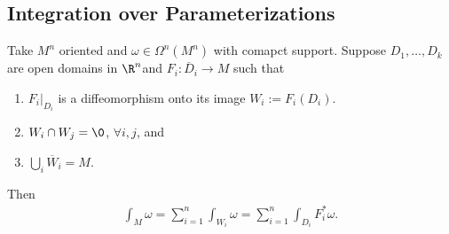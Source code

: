 \documentclass[11pt]{article}
\begin{document}
\subsection*{Integration over Parameterizations}
\label{sec:org1ce78e8}
Take \(M^{n}\) oriented and \(\omega\in\Omega^{n}(M^{n})\) with comapct support. Suppose \(D_{1},\ldots,D_{k}\) are open domains in \(\R^{n}\)and \(F_{i}:\overline{D}_{i}\to M\) such that\\
\begin{enumerate}
\item \(F_{i}|_{D_{i}}\) is a diffeomorphism onto its image \(W_{i}:=F_{i}(D_{i})\).\\
\item \(W_{i}\cap W_{j}=\0\), \(\forall i,j\), and\\
\item \(\bigcup_{i}\overline{W}_{i}=M\).\\
\end{enumerate}

Then\\
\begin{align*}
  \int_{M}\omega
  =\sum_{i=1}^{n}\int_{W_{i}}\omega
  =\sum_{i=1}^{n}\int_{D_{i}}F_{i}^{*}\omega.
\end{align*}
\end{document}
